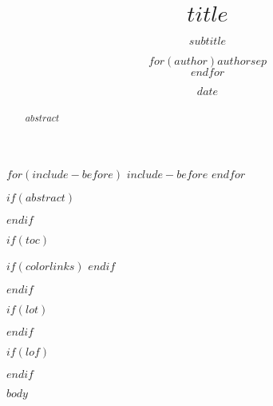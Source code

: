 \documentclass[doctor,twoside,chapterhead,otf]{znufethesis}
\title{\LARGE\textbf{$title$}}
\title{}
\subtitle{$subtitle$}
\author{$for(author)$$author$$sep$ \\ $endfor$}
\author{}
\date{$date$}
\date{}
\begin{document}

\blankpage

$for(include-before)$
$include-before$
$endfor$

\cleardoublepage
{} %

\blankpage

\cleardoublepage
\frontmatter
\pagestyle{plain}

\cleardoublepage
{} %
\ifodd\thepage
\blankpage
\fi

\cleardoublepage
\frontmatter

\ifodd\therealpage
\blankpage
\fi

$if(abstract)$
\begin{abstract}
$abstract$
\end{abstract}
$endif$

$if(toc)$
{
$if(colorlinks)$
\hypersetup{linkcolor=$if(toccolor)$$toccolor$$else$black$endif$}
$endif$

\setcounter{tocdepth}{$toc-depth$}
\cleardoublepage
{} %
\tableofcontents        %

\ifodd\thepage
\blankpage
\fi
}
$endif$

$if(lot)$
\cleardoublepage
{} %
\listoftables           %

\ifodd\thepage
\blankpage
\fi
$endif$

$if(lof)$
\cleardoublepage
{} %
\listoffigures          %

\ifodd\thepage
\blankpage
\fi
$endif$

\mainmatter
\pagestyle{mpage}

$body$

\ifodd\thepage
\blankpage
\fi
\end{document}
